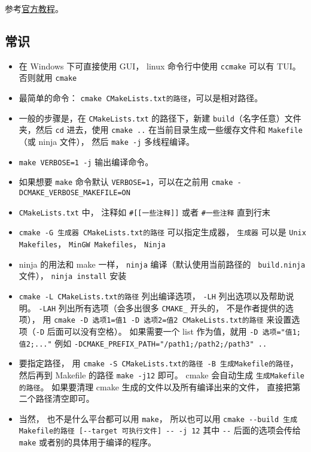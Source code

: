 


参考\href{https://cmake.org/cmake/help/latest/guide/tutorial/index.html}{官方教程}。

\subsection{常识}
\begin{itemize}
\item 在 Windows 下可直接使用 GUI， linux 命令行中使用 \verb`ccmake` 可以有 TUI。 否则就用 \verb`cmake`
\item 最简单的命令： \verb`cmake CMakeLists.txt的路径`，可以是相对路径。 
\item 一般的步骤是，在 \verb`CMakeLists.txt` 的路径下，新建 \verb`build`（名字任意）文件夹，然后 \verb`cd` 进去，使用 \verb`cmake ..` 在当前目录生成一些缓存文件和 \verb`Makefile`（或 ninja 文件）， 然后 \verb`make -j` 多线程编译。
\item \verb`make VERBOSE=1 -j` 输出编译命令。
\item 如果想要 \verb`make` 命令默认 \verb`VERBOSE=1`，可以在之前用 \verb`cmake -DCMAKE_VERBOSE_MAKEFILE=ON`
\item \verb`CMakeLists.txt` 中， 注释如 \verb`#[[一些注释]]` 或者 \verb`#一些注释` 直到行末
\item \verb`cmake -G 生成器 CMakeLists.txt的路径` 可以指定生成器， \verb`生成器` 可以是 \verb`Unix Makefiles`， \verb`MinGW Makefiles`， \verb`Ninja`
\item ninja 的用法和 make 一样， \verb`ninja` 编译（默认使用当前路径的 \verb` build.ninja` 文件）， \verb`ninja install` 安装
\item \verb`cmake -L CMakeLists.txt的路径` 列出编译选项， \verb`-LH` 列出选项以及帮助说明。 \verb`-LAH` 列出所有选项（会多出很多 \verb`CMAKE_` 开头的， 不是作者提供的选项）， 用 \verb`cmake -D 选项1=值1 -D 选项2=值2 CMakeLists.txt的路径` 来设置选项（\verb`-D` 后面可以没有空格）。 如果需要一个 list 作为值，就用 \verb`-D 选项="值1;值2;..."` 例如 \verb`-DCMAKE_PREFIX_PATH="/path1;/path2;/path3" ..`
\item 要指定路径， 用 \verb`cmake -S CMakeLists.txt的路径 -B 生成Makefile的路径`， 然后再到 Makefile 的路径 \verb`make -j12` 即可。 cmake 会自动生成 \verb`生成Makefile的路径`。 如果要清理 cmake 生成的文件以及所有编译出来的文件， 直接把第二个路径清空即可。
\item 当然， 也不是什么平台都可以用 \verb`make`， 所以也可以用 \verb`cmake --build 生成Makefile的路径 [--target 可执行文件] -- -j 12` 其中 \verb`--` 后面的选项会传给 \verb`make` 或者别的具体用于编译的程序。

\end{itemize}
